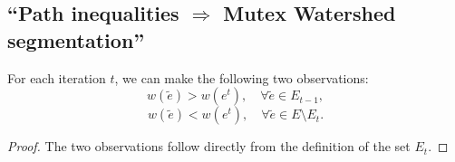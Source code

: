 
\subsection{``Path inequalities $\Rightarrow$ Mutex Watershed segmentation''}

\begin{proposition}
\label{prop:last_edge_PQ}For each iteration $t$, we can make the following two observations:
\begin{equation}
w(\tilde{e})>w(e^{t}),\quad\forall\tilde{e}\in E_{t-1},\label{eq:last_edge_PQ}
\end{equation}
\begin{equation}
w(\tilde{e})<w(e^{t}),\quad\forall\tilde{e}\in E \setminus E_{t}.\label{eq:last_edge_PQ_b}
\end{equation}
\end{proposition}
\begin{proof}
The two observations follow directly from the definition of the set $E_{t}$.
\end{proof}



